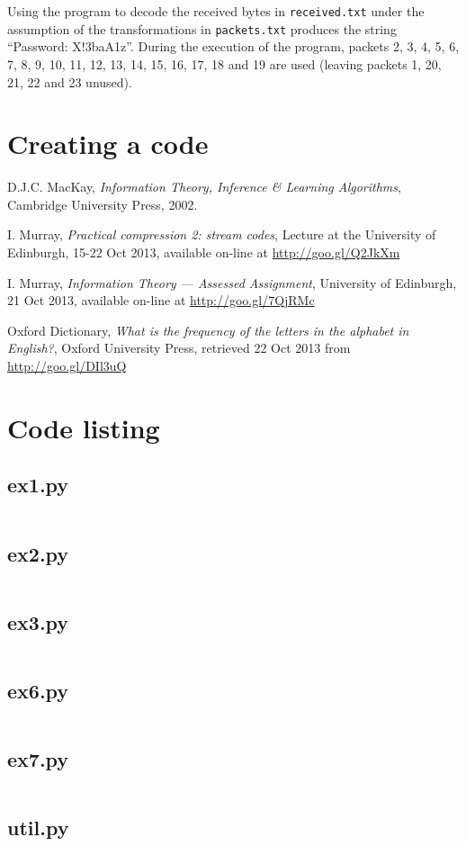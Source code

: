 \documentclass[10pt,a4paper,oneside,onecolumn]{article}
\newcommand*{\receivedTXT}{{\tt received.txt}\xspace}
\newcommand*{\packetsTXT}{{\tt packets.txt}\xspace}
\begin{document}
Using the program to decode the received bytes in \receivedTXT under the
assumption of the transformations in \packetsTXT produces the string ``Password:
X!3baA1z''. During the execution of the program, packets 2, 3, 4, 5, 6, 7, 8, 9,
10, 11, 12, 13, 14, 15, 16, 17, 18 and 19 are used (leaving packets 1, 20, 21,
22 and 23 unused).

\section{Creating a code}\label{sec:ex8}


\begin{thebibliography}{9}

    D.J.C. MacKay,
    \emph{Information Theory, Inference \& Learning Algorithms},
    Cambridge University Press,
    2002.

    I. Murray,
    \emph{Practical compression 2: stream codes},
    Lecture at the University of Edinburgh,
    15-22 Oct 2013,
    available on-line at \url{http://goo.gl/Q2JkXm}

    I. Murray,
    \emph{Information Theory — Assessed Assignment},
    University of Edinburgh,
    21 Oct 2013,
    available on-line at \url{http://goo.gl/7QjRMc}

    Oxford Dictionary,
    \emph{What is the frequency of the letters in the alphabet in English?},
    Oxford University Press,
    retrieved 22 Oct 2013 from \url{http://goo.gl/DIl3uQ}

\end{thebibliography}


\onecolumn
\appendixpage
\appendix

\section{Code listing}

\subsection{ex1.py}\label{app:ex1}
\inputminted{python}{../src/ex1.py}
\newpage

\subsection{ex2.py}\label{app:ex2}
\inputminted{python}{../src/ex2.py}
\newpage

\subsection{ex3.py}\label{app:ex3}
\inputminted{python}{../src/ex3.py}
\newpage

\subsection{ex6.py}\label{app:ex6}
\inputminted{python}{../src/ex6.py}
\newpage

\subsection{ex7.py}\label{app:ex7}
\inputminted{python}{../src/ex7.py}
\newpage

\subsection{util.py}\label{app:util}
\inputminted{python}{../src/util.py}
\end{document}
